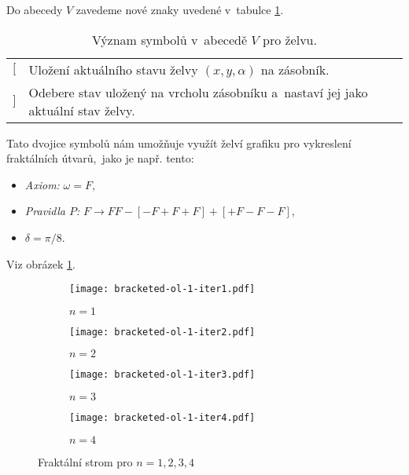 Do abecedy $V$ zavedeme nové znaky uvedené v~tabulce \ref{table:vyznam-symbolu-zelva-zasobnik}. 
\begin{table}[H]
    \centering
    \begin{tabular}{lp{}}
        $[$ & Uložení aktuálního stavu želvy $(x,y,\alpha)$ na zásobník.\\
        $]$ & Odebere stav uložený na vrcholu zásobníku a~nastaví jej jako aktuální stav želvy.
    \end{tabular}
    \caption{Význam symbolů v~abecedě $V$ pro želvu.}
    \label{table:vyznam-symbolu-zelva-zasobnik}
\end{table}
Tato dvojice symbolů nám umožňuje využít želví grafiku pro vykreslení fraktálních útvarů,~jako je např. tento:
\begin{itemize}
    \item \emph{Axiom:} $\omega=F$,
    \item \emph{Pravidla $P$:} $F\to FF-[-F+F+F]+[+F-F-F]$,
    \item $\delta=\pi/8$.
\end{itemize}
Viz obrázek \ref{fig:fraktalni-strom}.
\begin{figure}[H]
    \centering
    \begin{subfigure}{0.3\textwidth}
        \centering
        \texttt{[image: bracketed-ol-1-iter1.pdf]}
        \begin{center}
            $n=1$
        \end{center}
    \end{subfigure}
    \begin{subfigure}{0.3\textwidth}
        \centering
        \texttt{[image: bracketed-ol-1-iter2.pdf]}
        \begin{center}
            $n=2$
        \end{center}
    \end{subfigure}
    \begin{subfigure}{0.3\textwidth}
        \centering
        \texttt{[image: bracketed-ol-1-iter3.pdf]}
        \begin{center}
            $n=3$
        \end{center}
    \end{subfigure}
    \begin{subfigure}{0.4\textwidth}
        \centering
        \texttt{[image: bracketed-ol-1-iter4.pdf]}
        \begin{center}
            $n=4$
        \end{center}
    \end{subfigure}
    \caption{Fraktální strom pro $n=1,2,3,4$}
    \label{fig:fraktalni-strom}
\end{figure}

